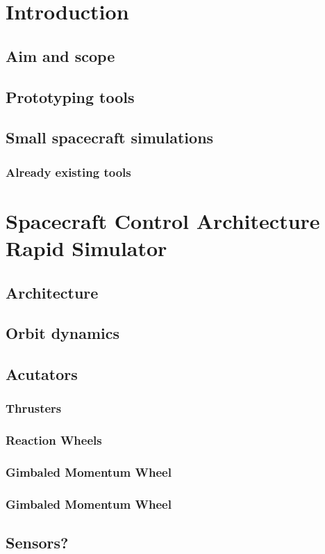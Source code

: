 \documentclass{article}
\begin{document}
\section{Introduction}
\subsection{Aim and scope}
\subsection{Prototyping tools}
\subsection{Small spacecraft simulations}
\subsubsection{Already existing tools}
\section{Spacecraft Control Architecture Rapid Simulator}
\subsection{Architecture}
\subsection{Orbit dynamics}
\subsection{Acutators}
\subsubsection{Thrusters}
\subsubsection{Reaction Wheels}
\subsubsection{Gimbaled Momentum Wheel}
\subsubsection{Gimbaled Momentum Wheel}
\subsection{Sensors?}
\end{document}

